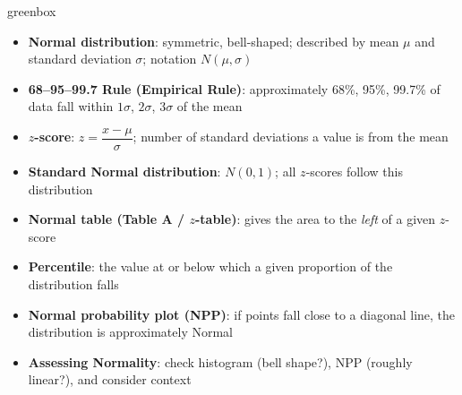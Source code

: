 \documentclass[10pt]{article}
\begin{document}
\boxguard
\begin{skillbox}{greenbox}
\begin{minipage}[t]{0.48\linewidth}
    \begin{itemize}
        \item \textbf{Normal distribution}: symmetric, bell-shaped; described by mean $\mu$ and standard deviation $\sigma$; notation $N(\mu, \sigma)$
        \item \textbf{68--95--99.7 Rule (Empirical Rule)}: approximately 68\%, 95\%, 99.7\% of data fall within $1\sigma$, $2\sigma$, $3\sigma$ of the mean
        \item \textbf{$z$-score}: $z = \dfrac{x - \mu}{\sigma}$; number of standard deviations a value is from the mean
        \item \textbf{Standard Normal distribution}: $N(0, 1)$; all $z$-scores follow this distribution
    \end{itemize}
\end{minipage}
\hfill
\begin{minipage}[t]{0.48\linewidth}
    \begin{itemize}
        \item \textbf{Normal table (Table A / $z$-table)}: gives the area to the \textit{left} of a given $z$-score
        \item \textbf{Percentile}: the value at or below which a given proportion of the distribution falls
        \item \textbf{Normal probability plot (NPP)}: if points fall close to a diagonal line, the distribution is approximately Normal
        \item \textbf{Assessing Normality}: check histogram (bell shape?), NPP (roughly linear?), and consider context
    \end{itemize}
\end{minipage}
\end{skillbox}
\end{document}
